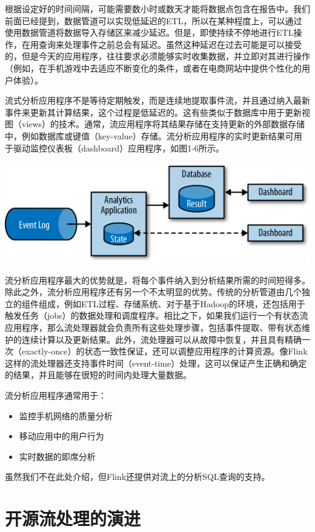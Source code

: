 \documentclass[oneside]{ctexbook}
\begin{document}
根据设定好的时间间隔，可能需要数小时或数天才能将数据点包含在报告中。我们前面已经提到，数据管道可以实现低延迟的ETL，所以在某种程度上，可以通过使用数据管道将数据导入存储区来减少延迟。但是，即使持续不停地进行ETL操作，在用查询来处理事件之前总会有延迟。虽然这种延迟在过去可能是可以接受的，但是今天的应用程序，往往要求必须能够实时收集数据，并立即对其进行操作（例如，在手机游戏中去适应不断变化的条件，或者在电商网站中提供个性化的用户体验）。

流式分析应用程序不是等待定期触发，而是连续地提取事件流，并且通过纳入最新事件来更新其计算结果，这个过程是低延迟的。这有些类似于数据库中用于更新视图（views）的技术。通常，流应用程序将其结果存储在支持更新的外部数据存储中，例如数据库或键值（key-value）存储。流分析应用程序的实时更新结果可用于驱动监控仪表板（dashboard）应用程序，如图1-6所示。

\noindent\includegraphics[]{images/spaf_0106.png}

流分析应用程序最大的优势就是，将每个事件纳入到分析结果所需的时间短得多。除此之外，流分析应用程序还有另一个不太明显的优势。传统的分析管道由几个独立的组件组成，例如ETL过程、存储系统、对于基于Hadoop的环境，还包括用于触发任务（jobs）的数据处理和调度程序。相比之下，如果我们运行一个有状态流应用程序，那么流处理器就会负责所有这些处理步骤，包括事件提取、带有状态维护的连续计算以及更新结果。此外，流处理器可以从故障中恢复，并且具有精确一次（exactly-once）的状态一致性保证，还可以调整应用程序的计算资源。像Flink这样的流处理器还支持事件时间（event-time）处理，这可以保证产生正确和确定的结果，并且能够在很短的时间内处理大量数据。

流分析应用程序通常用于：

\begin{itemize}
  \item 监控手机网络的质量分析
  \item 移动应用中的用户行为
  \item 实时数据的即席分析
\end{itemize}

虽然我们不在此处介绍，但Flink还提供对流上的分析SQL查询的支持。

\section{开源流处理的演进}
\end{document}
